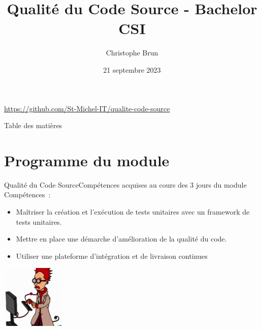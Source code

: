 \documentclass{beamer}
\title{Qualité du Code Source - Bachelor CSI}
\author{Christophe Brun}
\institute{Campus Saint-Michel IT}
\date{21 septembre 2023}
\begin{document}
    \begin{frame}
        \transdissolve
        \titlepage
        \bigbreak
        \url{https://github.com/St-Michel-IT/qualite-code-source}
    \end{frame}

    \begin{frame}{Table des matières}
        \tableofcontents
    \end{frame}


    \section{Programme du module}\label{sec:programme-du-module}
    \begin{frame}{Qualité du Code Source}{Compétences acquises au cours des 3 jours du module}
        \transdissolve
        Compétences~:
        \begin{itemize}
            \item Maîtriser la création et l’exécution de tests unitaires avec un framework de tests unitaires.
            \item Mettre en place une démarche d’amélioration de la qualité du code.
            \item Utiliser une plateforme d’intégration et de livraison continues

        \end{itemize}
        \centering
        \includegraphics[width=3cm]{image/funny-cartoon-of-a-smart-young-computer-scientist}
    \end{frame}
\end{document}
